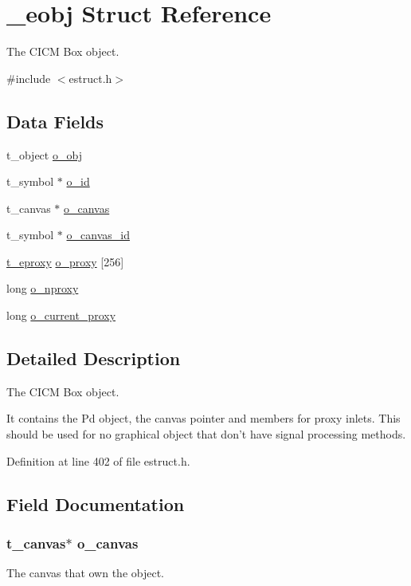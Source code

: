 \hypertarget{struct__eobj}{\section{\-\_\-eobj Struct Reference}
\label{struct__eobj}
}


The C\-I\-C\-M Box object.  




{\ttfamily \#include $<$estruct.\-h$>$}

\subsection*{Data Fields}
\begin{DoxyCompactItemize}
\item 
t\-\_\-object \hyperlink{struct__eobj_a8cffa8f3338cca7779ab922dab19227c}{o\-\_\-obj}
\item 
t\-\_\-symbol $\ast$ \hyperlink{struct__eobj_a024c5a2d6d2dcdf531f05a0e711cce68}{o\-\_\-id}
\item 
t\-\_\-canvas $\ast$ \hyperlink{struct__eobj_a4ac1a6544ba0591b83cbf38bc1349e74}{o\-\_\-canvas}
\item 
t\-\_\-symbol $\ast$ \hyperlink{struct__eobj_ab7f7ce6beaff87d1baca1a619b9a7ebf}{o\-\_\-canvas\-\_\-id}
\item 
\hyperlink{struct__eproxy}{t\-\_\-eproxy} \hyperlink{struct__eobj_a9435dcf0a1aed105a4c38d24dfc65dbf}{o\-\_\-proxy} \mbox{[}256\mbox{]}
\item 
long \hyperlink{struct__eobj_a5959b8f1e0726d2a7d82a4d39ae803bb}{o\-\_\-nproxy}
\item 
long \hyperlink{struct__eobj_a32a8921c66d63fcccc9df035f6b9160f}{o\-\_\-current\-\_\-proxy}
\end{DoxyCompactItemize}


\subsection{Detailed Description}
The C\-I\-C\-M Box object. 

It contains the Pd object, the canvas pointer and members for proxy inlets. This should be used for no graphical object that don't have signal processing methods. 

Definition at line 402 of file estruct.\-h.



\subsection{Field Documentation}
\hypertarget{struct__eobj_a4ac1a6544ba0591b83cbf38bc1349e74}{
\subsubsection[{o\-\_\-canvas}]{\setlength{\rightskip}{0pt plus 5cm}t\-\_\-canvas$\ast$ o\-\_\-canvas}}\label{struct__eobj_a4ac1a6544ba0591b83cbf38bc1349e74}
The canvas that own the object. 

